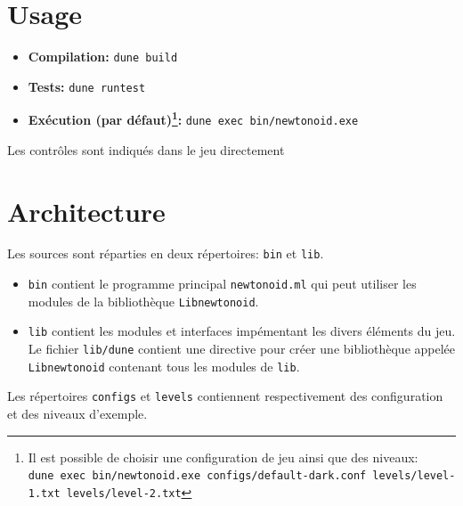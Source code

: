 \documentclass[french]{template}
\begin{document}

\fairemarges
\fairepagedegarde
\tabledematieres

\newpage

\section{Usage}

\begin{itemize}
    \item \textbf{Compilation:} \texttt{dune build}
    \item \textbf{Tests:} \texttt{dune runtest}
    \item \textbf{Exécution (par défaut)\footnote{Il est possible de choisir une configuration de jeu ainsi que des niveaux:\\\texttt{dune exec bin/newtonoid.exe configs/default-dark.conf levels/level-1.txt levels/level-2.txt}}:} \texttt{dune exec bin/newtonoid.exe}
\end{itemize}

Les contrôles sont indiqués dans le jeu directement

\section{Architecture}

Les sources sont réparties en deux répertoires: \texttt{bin} et \texttt{lib}.

\begin{itemize}
    \item \texttt{bin} contient le programme principal \texttt{newtonoid.ml} qui peut utiliser les modules de la bibliothèque \texttt{Libnewtonoid}.
    \item \texttt{lib} contient les modules et interfaces impémentant les divers éléments du jeu. Le fichier \texttt{lib/dune} contient une directive pour créer une bibliothèque appelée \texttt{Libnewtonoid} contenant tous les modules de \texttt{lib}.
\end{itemize}

Les répertoires \texttt{configs} et \texttt{levels} contiennent respectivement des configuration et des niveaux d'exemple.
\end{document}
